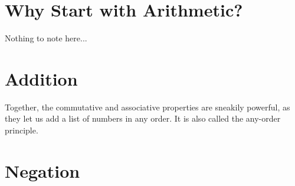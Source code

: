 \documentclass[../main.tex]{subfiles}
\begin{document}
\section{Why Start with Arithmetic?}
Nothing to note here...

\section{Addition}
Together, the commutative and associative properties are sneakily powerful, as they let us add a list of numbers in any order. It is also called the  any-order principle.


\section{Negation}
\end{document}
